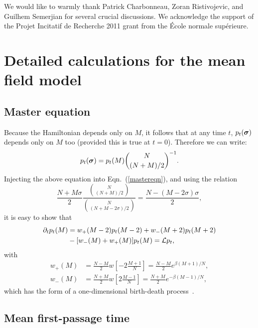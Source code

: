 \documentclass[aps,twocolumn,floats,pre,amsmath,superscriptaddress]{revtex4}
\newcommand{\beq}{\begin{equation}}
\newcommand{\eeq}{\end{equation}}
\newcommand{\<}{\langle}
\renewcommand{\>}{\rangle}
\newcommand{\bs}{ \mbox{\boldmath$\sigma$}}
\begin{document}
\acknowledgments

We would like to warmly thank Patrick Charbonneau, Zoran Ristivojevic, and Guilhem Semerjian for several crucial discussions. 
We acknowledge the support of the Projet Incitatif de Recherche 2011 grant from the \'Ecole normale sup\'erieure.






\appendix





\section{Detailed calculations for the mean field
model}\label{AppendixMF}

\subsection{Master equation}

Because the Hamiltonian depends only on $M$, 
it follows that at any time $t$,
$p_t(\bs)$ depends only on $M$ too (provided this is true at
$t=0$). Therefore we can write:
\beq
p_t(\bs) = p_t(M) \binom{N}{(N+M)/2}^{-1}.
\eeq 
Injecting the above equation into Eqn.~(\ref{mastereqn}), and using
the relation
\beq
\frac{N+M \sigma}2 \frac{\binom{N}{(N+M)/2}}{\binom{N}{(N+M-2\sigma)/2}}
= \frac{N- (M-2\sigma) \sigma}2,
\eeq
it is easy to show that
\beq\label{MFmaster}
\begin{split}
\partial_t p_t(M) &= w_+(M-2) p_t(M-2) + w_-(M+2) p_t(M+2) \\
& - [w_-(M) + w_+(M)] p_t(M) = \LL p_t,
\end{split}\eeq
with
\beq\begin{split}
w_+(M) &= \frac{N-M}2 w \left[-2 \frac{M+1}N \right]=\frac{N-M}2 e^{\beta (M+1)/N}, \\
w_-(M) &= \frac{N+M}2 w \left[2 \frac{M-1}N \right]=\frac{N+M}2 e^{-\beta(M-1)/N},
\end{split}\eeq
which has the form of a one-dimensional birth-death process~\cite[Section 7.1]{gardiner}.


\subsection{Mean first-passage time}
\end{document}
